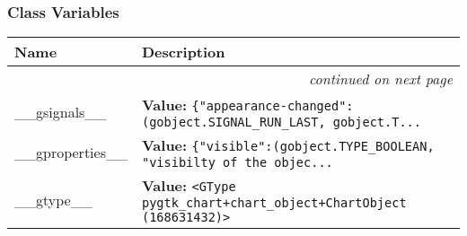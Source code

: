 
  \subsubsection{Class Variables}

    \vspace{-1cm}
\hspace{\varindent}\begin{longtable}{|p{\varnamewidth}|p{\vardescrwidth}|l}
\cline{1-2}
\cline{1-2} \centering \textbf{Name} & \centering \textbf{Description}& \\
\cline{1-2}
\endhead\cline{1-2}\multicolumn{3}{r}{\small\textit{continued on next page}}\\\endfoot\cline{1-2}
\endlastfoot\raggedright \_\-\_\-g\-s\-i\-g\-n\-a\-l\-s\-\_\-\_\- & \raggedright \textbf{Value:} 
{\tt \{"appearance-changed":(gobject.SIGNAL\_RUN\_LAST, gobject.T\texttt{...}}&\\
\cline{1-2}
\raggedright \_\-\_\-g\-p\-r\-o\-p\-e\-r\-t\-i\-e\-s\-\_\-\_\- & \raggedright \textbf{Value:} 
{\tt \{"visible":(gobject.TYPE\_BOOLEAN, "visibilty of the objec\texttt{...}}&\\
\cline{1-2}
\raggedright \_\-\_\-g\-t\-y\-p\-e\-\_\-\_\- & \raggedright \textbf{Value:} 
{\tt {\textless}GType pygtk\_chart+chart\_object+ChartObject (168631432){\textgreater}}&\\
\cline{1-2}
\end{longtable}

